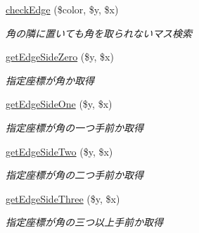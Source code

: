 \begin{DoxyCompactItemize}
\hyperlink{class_reversi_acd2c64ea43cc26407ad64920a183446b}{check\+Edge} (\$color, \$y, \$x)
\begin{DoxyCompactList}\small\item\em 角の隣に置いても角を取られないマス検索 \end{DoxyCompactList}\item 
\hyperlink{class_reversi_a76a7addedc2b0ba83c6b46ce0601076c}{get\+Edge\+Side\+Zero} (\$y, \$x)
\begin{DoxyCompactList}\small\item\em 指定座標が角か取得 \end{DoxyCompactList}\item 
\hyperlink{class_reversi_a98aff7f2db3a9feacbe98293c6b80eb4}{get\+Edge\+Side\+One} (\$y, \$x)
\begin{DoxyCompactList}\small\item\em 指定座標が角の一つ手前か取得 \end{DoxyCompactList}\item 
\hyperlink{class_reversi_a968982683aa41f50c83789a9be05aaba}{get\+Edge\+Side\+Two} (\$y, \$x)
\begin{DoxyCompactList}\small\item\em 指定座標が角の二つ手前か取得 \end{DoxyCompactList}\item 
\hyperlink{class_reversi_ab299d2488c8ab29f646e449d3204efbc}{get\+Edge\+Side\+Three} (\$y, \$x)
\begin{DoxyCompactList}\small\item\em 指定座標が角の三つ以上手前か取得 \end{DoxyCompactList}\end{DoxyCompactItemize}
